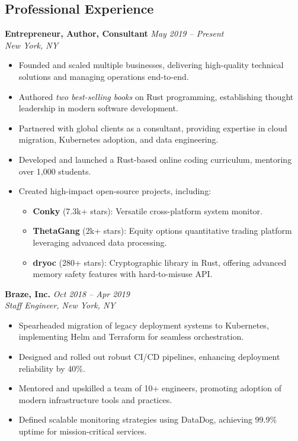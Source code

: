 \documentclass[margin,line]{resume}
\begin{document}
\begin{resume}
\vspace{10pt}

\section{Professional Experience}

\textbf{Entrepreneur, Author, Consultant} \hfill \textit{May 2019 -- Present} \\
\textit{New York, NY}
\begin{itemize}[leftmargin=0.5cm]
    \item Founded and scaled multiple businesses, delivering high-quality technical solutions and managing operations end-to-end.
    \item Authored \textit{two best-selling books} on Rust programming, establishing thought leadership in modern software development.
    \item Partnered with global clients as a consultant, providing expertise in cloud migration, Kubernetes adoption, and data engineering.
    \item Developed and launched a Rust-based online coding curriculum, mentoring over 1,000 students.
    \item Created high-impact open-source projects, including:
        \begin{itemize}
            \item \textbf{Conky} (7.3k+ stars): Versatile cross-platform system monitor.
            \item \textbf{ThetaGang} (2k+ stars): Equity options quantitative trading platform leveraging advanced data processing.
            \item \textbf{dryoc} (280+ stars): Cryptographic library in Rust, offering advanced memory safety features with hard-to-misuse API.
        \end{itemize}
\end{itemize}

\textbf{Braze, Inc.} \hfill \textit{Oct 2018 -- Apr 2019} \\
\textit{Staff Engineer, New York, NY}
\begin{itemize}[leftmargin=0.5cm]
    \item Spearheaded migration of legacy deployment systems to Kubernetes, implementing Helm and Terraform for seamless orchestration.
    \item Designed and rolled out robust CI/CD pipelines, enhancing deployment reliability by 40\%.
    \item Mentored and upskilled a team of 10+ engineers, promoting adoption of modern infrastructure tools and practices.
    \item Defined scalable monitoring strategies using DataDog, achieving 99.9\% uptime for mission-critical services.
\end{itemize}


\end{resume}
\end{document}
